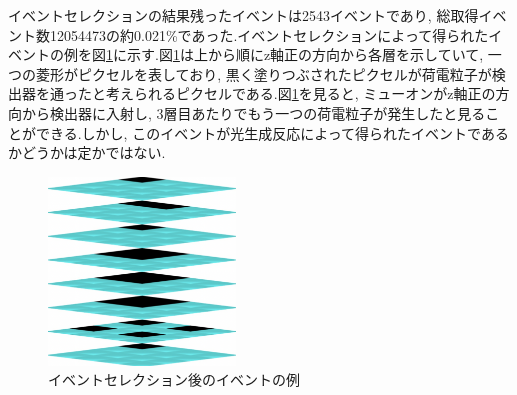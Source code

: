 イベントセレクションの結果残ったイベントは2543イベントであり, 総取得イベント数12054473の約0.021\%であった.イベントセレクションによって得られたイベントの例を図\ref{fig:eventcuted_event}に示す.図\ref{fig:eventcuted_event}は上から順にz軸正の方向から各層を示していて, 一つの菱形がピクセルを表しており, 黒く塗りつぶされたピクセルが荷電粒子が検出器を通ったと考えられるピクセルである.図\ref{fig:eventcuted_event}を見ると, ミューオンがz軸正の方向から検出器に入射し, 3層目あたりでもう一つの荷電粒子が発生したと見ることができる.しかし, このイベントが光生成反応によって得られたイベントであるかどうかは定かではない.
\begin{figure}[H]
    \centering
    \includegraphics[height=5.0cm]{img/eventcutted_figure.png}
    \caption{イベントセレクション後のイベントの例}
    \label{fig:eventcuted_event}
\end{figure}

